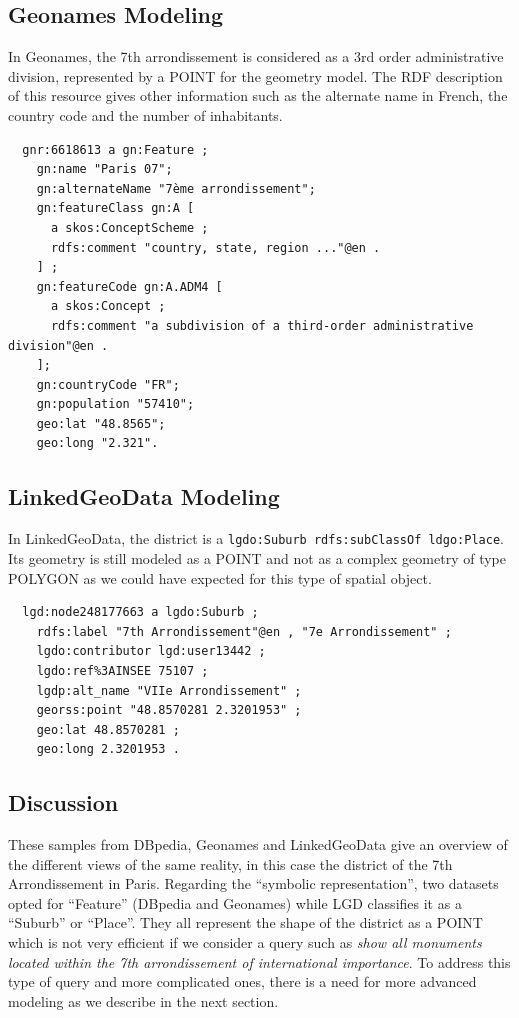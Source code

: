 \documentclass[a4paper,11pt]{report}
\begin{document}
\subsection{Geonames Modeling}
In Geonames, the 7th arrondissement is considered as a 3rd order administrative division, represented by a POINT for the geometry model. The RDF description of this resource gives other information such as the alternate name in French, the country code and the number of inhabitants.
{\scriptsize
\begin{verbatim}
  gnr:6618613 a gn:Feature ;
    gn:name "Paris 07";
    gn:alternateName "7ème arrondissement";
    gn:featureClass gn:A [
      a skos:ConceptScheme ;
      rdfs:comment "country, state, region ..."@en .
    ] ;
    gn:featureCode gn:A.ADM4 [
      a skos:Concept ;
      rdfs:comment "a subdivision of a third-order administrative division"@en .
    ];
    gn:countryCode "FR";
    gn:population "57410";
    geo:lat "48.8565";
    geo:long "2.321".
\end{verbatim}
}

\subsection{LinkedGeoData Modeling}
In LinkedGeoData, the district is a \texttt{lgdo:Suburb rdfs:subClassOf ldgo:Place}. Its geometry is still modeled as a POINT and not as a complex geometry of type POLYGON as we could have expected for this type of spatial object.
{\scriptsize
\begin{verbatim}
  lgd:node248177663 a lgdo:Suburb ;
    rdfs:label "7th Arrondissement"@en , "7e Arrondissement" ;
    lgdo:contributor lgd:user13442 ;
    lgdo:ref%3AINSEE 75107 ;
    lgdp:alt_name "VIIe Arrondissement" ;
    georss:point "48.8570281 2.3201953" ;
    geo:lat 48.8570281 ;
    geo:long 2.3201953 .
\end{verbatim}
}

\subsection{Discussion}
These samples from DBpedia, Geonames and LinkedGeoData give an overview of the different views of the same reality, in this case the district of the 7th Arrondissement in Paris. Regarding the ``symbolic representation'', two datasets opted for ``Feature'' (DBpedia and Geonames) while LGD classifies it as a ``Suburb'' or ``Place''. They all represent the shape of the district as a POINT which is not very efficient if we consider a query such as \emph{show all monuments located within the 7th arrondissement of international importance}. To address this type of query and more complicated ones, there is a need for more advanced modeling as we describe in the next section.
\end{document}
